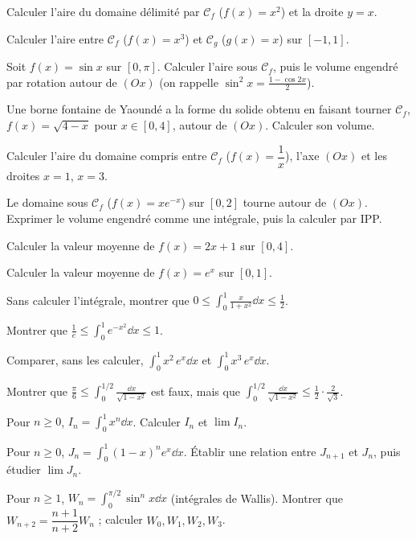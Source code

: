 \exo{} Calculer l'aire du domaine délimité par $\mathcal C_f$ ($f(x)=x^2$) et la droite $y=x$.

\exo{} Calculer l'aire entre $\mathcal C_f$ ($f(x)=x^3$) et $\mathcal C_g$ ($g(x)=x$) sur $[-1,1]$.

\exo{} Soit $f(x)=\sin x$ sur $[0,\pi]$. Calculer l'aire sous $\mathcal C_f$, puis le volume
engendré par rotation autour de $(Ox)$ (on rappelle $\sin^2 x=\frac{1-\cos 2x}{2}$).

\exo{} Une borne fontaine de Yaoundé a la forme du solide obtenu en faisant tourner
$\mathcal C_f$, $f(x)=\sqrt{4-x}$ pour $x\in[0,4]$, autour de $(Ox)$. Calculer son volume.

\exo{} Calculer l'aire du domaine compris entre $\mathcal C_f$ ($f(x)=\dfrac1x$), l'axe $(Ox)$
et les droites $x=1$, $x=3$.

\exo{} Le domaine sous $\mathcal C_f$ ($f(x)=x e^{-x}$) sur $[0,2]$ tourne autour de $(Ox)$.
Exprimer le volume engendré comme une intégrale, puis la calculer par IPP.

\exo{} Calculer la valeur moyenne de $f(x)=2x+1$ sur $[0,4]$.

\exo{} Calculer la valeur moyenne de $f(x)=e^{x}$ sur $[0,1]$.

\exo{} Sans calculer l'intégrale, montrer que $\displaystyle 0\le\int_0^1\frac{x}{1+x^2}\dd x\le\frac12$.

\exo{} Montrer que $\displaystyle\frac{1}{e}\le\int_0^1 e^{-x^2}\dd x\le1$.

\exo{} Comparer, sans les calculer, $\displaystyle\int_0^1 x^2\,e^{x}\dd x$ et
$\displaystyle\int_0^1 x^3\,e^{x}\dd x$.

\exo{} Montrer que $\displaystyle\frac{\pi}{6}\le\int_0^{1/2}\frac{\dd x}{\sqrt{1-x^2}}$ est faux,
mais que $\displaystyle\int_0^{1/2}\frac{\dd x}{\sqrt{1-x^2}}\le\frac{1}{2}\cdot\frac{2}{\sqrt3}$.

\exo{} Pour $n\ge0$, $\displaystyle I_n=\int_0^1 x^n\dd x$. Calculer $I_n$ et $\lim I_n$.

\exo{} Pour $n\ge0$, $\displaystyle J_n=\int_0^1 (1-x)^n e^x\dd x$. Établir une relation entre
$J_{n+1}$ et $J_n$, puis étudier $\lim J_n$.

\exo{} Pour $n\ge1$, $\displaystyle W_n=\int_0^{\pi/2}\sin^n x\dd x$ (intégrales de Wallis).
Montrer que $W_{n+2}=\dfrac{n+1}{n+2}W_n$ ; calculer $W_0,W_1,W_2,W_3$.

